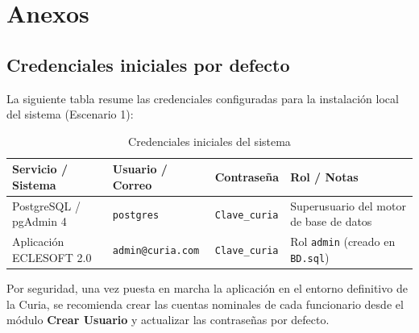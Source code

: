 \chapter{Anexos}

\section{Credenciales iniciales por defecto}
La siguiente tabla resume las credenciales configuradas para la instalación local del sistema (Escenario 1):

\begin{table}[h]
    \centering
    \begin{tabular}{|l|l|l|l|}
        \hline
        \textbf{Servicio / Sistema} & \textbf{Usuario / Correo} & \textbf{Contraseña} & \textbf{Rol / Notas} \\ \hline
        PostgreSQL / pgAdmin 4 & \texttt{postgres} & \texttt{Clave\_curia} & Superusuario del motor de base de datos \\ \hline
        Aplicación ECLESOFT 2.0 & \texttt{admin@curia.com} & \texttt{Clave\_curia} & Rol \texttt{admin} (creado en \texttt{BD.sql}) \\ \hline
    \end{tabular}
    \caption{Credenciales iniciales del sistema}
\end{table}

\begin{alerta}
Por seguridad, una vez puesta en marcha la aplicación en el entorno definitivo de la Curia, se recomienda crear las cuentas nominales de cada funcionario desde el módulo \textbf{Crear Usuario} y actualizar las contraseñas por defecto.
\end{alerta}

